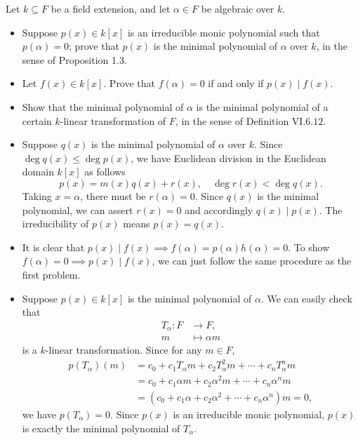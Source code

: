 \hypertarget{Exercise VII.1.7}{}
\begin{problem}[1.7]
	Let $k \subseteq F$ be a field extension, and let $\alpha \in F$ be algebraic over $k$.
	\begin{itemize}
		\item Suppose $p(x) \in k[x]$ is an irreducible monic polynomial such that $p(\alpha)=0$; prove that $p(x)$ is the minimal polynomial of $\alpha$ over $k$, in the sense of Proposition 1.3.
		\item Let $f(x) \in k[x]$. Prove that $f(\alpha)=0$ if and only if $p(x) \mid f(x)$.
		\item Show that the minimal polynomial of $\alpha$ is the minimal polynomial of a certain $k$-linear transformation of $F$, in the sense of Definition $\mathrm{VI}.6.12$.
	\end{itemize}
\end{problem}
\begin{solution}
	\begin{itemize}
		\item Suppose $q(x)$ is the minimal polynomial of $\alpha$ over $k$. Since $\deg q(x)\le \deg p(x)$, we have Euclidean division in the Euclidean domain $k[x]$ as follows
		\[
			p(x) = m(x)q(x) + r(x),\quad \deg r(x)<\deg q(x).
		\]
		Taking $x=\alpha$, there must be $r(\alpha)=0$. Since $q(x)$ is the minimal polynomial, we can assert $r(x)=0$ and accordingly $q(x)\mid p(x)$. The irreducibility of $p(x)$ means $p(x) = q(x)$.
		\item It is clear that $p(x) \mid f(x)\implies f(\alpha)=p(\alpha)h(\alpha)=0$. To show $f(\alpha)=0\implies p(x) \mid f(x)$, we can just follow the same procedure as the first problem.
		\item Suppose $p(x) \in k[x]$ is the minimal polynomial of $\alpha$. We can easily check that
		\begin{align*}
			T_\alpha:F&\longrightarrow F,\\
			 m&\longmapsto\alpha m
		\end{align*} 
		is a $k$-linear transformation. Since for any $m\in F$,
		\begin{align*}
			p(T_\alpha)(m)&=c_0+c_1T_\alpha m+c_2T_\alpha^2 m+\cdots+c_nT_\alpha^n m\\
			&=c_0+c_1\alpha m+c_2\alpha^2 m+\cdots+c_n\alpha^n m\\
			&=\left(c_0+c_1\alpha +c_2\alpha^2 +\cdots+c_n\alpha^n\right) m=0,
		\end{align*}
		we have $p(T_\alpha)=0$. Since $p(x)$ is an irreducible monic polynomial, $p(x)$ is exactly the minimal polynomial of $T_\alpha$.
	\end{itemize}
\end{solution}

